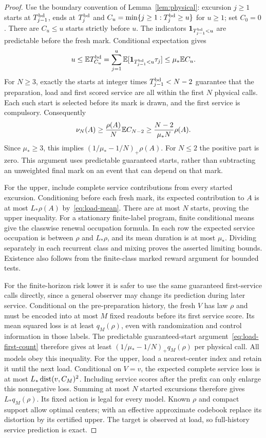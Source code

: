 \begin{proof}
Use the boundary convention of Lemma~\ref{lem:physical}: excursion $j\ge1$ starts at $T_{j-1}^{\rm bd}$, ends at $T_j^{\rm bd}$ and $C_u=\min\{j\ge1:T_j^{\rm bd}\ge u\}$ for $u\ge1$; set $C_0=0$. There are $C_u\le u$ starts strictly before $u$. The indicators $\mathbf 1_{T_{j-1}^{\rm bd}<u}$ are predictable before the fresh mark. Conditional expectation gives
\[
 u\le\mathbb E T_{C_u}^{\rm bd}
 =\sum_{j=1}^{u}\mathbb E[\mathbf 1_{T_{j-1}^{\rm bd}<u}\tau_j]
 \le\mu_*\mathbb E C_u.
\]
For $N\ge3$, exactly the starts at integer times $T_{j-1}^{\rm bd}<N-2$ guarantee that the preparation, load and first scored service are all within the first $N$ physical calls. Each such start is selected before its mark is drawn, and the first service is compulsory. Consequently
\begin{equation}\label{eq:load-first-count}
 \nu_N(A)\ge\frac{\rho(A)}N\mathbb E C_{N-2}
 \ge\frac{N-2}{\mu_*N}\rho(A).
\end{equation}
Since $\mu_*\ge3$, this implies $(1/\mu_*-1/N)_+\rho(A)$. For $N\le2$ the positive part is zero. This argument uses predictable guaranteed starts, rather than subtracting an unweighted final mark on an event that can depend on that mark.

For the upper, include complete service contributions from every started excursion. Conditioning before each fresh mark, its expected contribution to $A$ is at most $L_*\rho(A)$ by~\eqref{eq:load-mean}. There are at most $N$ starts, proving the upper inequality. For a stationary finite-label program, finite conditional means give the classwise renewal occupation formula. In each row the expected service occupation is between $\rho$ and $L_*\rho$, and its mean duration is at most $\mu_*$. Dividing separately in each recurrent class and mixing proves the asserted limiting bounds. Existence also follows from the finite-class marked reward argument for bounded tests.

For the finite-horizon risk lower it is safer to use the same guaranteed first-service calls directly, since a general observer may change its prediction during later service. Conditional on the pre-preparation history, the fresh $V$ has law $\rho$ and must be encoded into at most $M$ fixed readouts before its first service score. Its mean squared loss is at least $q_M(\rho)$, even with randomization and control information in those labels. The predictable guaranteed-start argument~\eqref{eq:load-first-count} therefore gives at least $(1/\mu_*-1/N)_+q_M(\rho)$ per physical call. All models obey this inequality. For the upper, load a nearest-center index and retain it until the next load. Conditional on $V=v$, the expected complete service loss is at most $L_*\operatorname{dist}(v,C_M)^2$. Including service scores after the prefix can only enlarge this nonnegative loss. Summing at most $N$ started excursions therefore gives $L_*q_M(\rho)$. Its fixed action is legal for every model. Known $\rho$ and compact support allow optimal centers; with an effective approximate codebook replace its distortion by its certified upper. The target is observed at load, so full-history service prediction is exact.
\end{proof}

